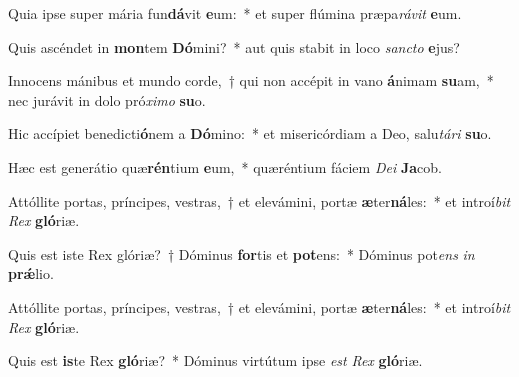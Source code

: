 \item Quia ipse super mária fun\textbf{dá}vit \textbf{e}um:~* et super flúmina præpa\textit{rá}\textit{vit} \textbf{e}um.
\item Quis ascéndet in \textbf{mon}tem \textbf{Dó}mini?~* aut quis stabit in loco \textit{sanc}\textit{to} \textbf{e}jus?
\item Innocens mánibus et mundo corde,~† qui non accépit in vano \textbf{á}nimam \textbf{su}am,~* nec jurávit in dolo pró\textit{xi}\textit{mo} \textbf{su}o.
\item Hic accípiet benedicti\textbf{ó}nem a \textbf{Dó}mino:~* et misericórdiam a Deo, salu\textit{tá}\textit{ri} \textbf{su}o.
\item Hæc est generátio quæ\textbf{rén}tium \textbf{e}um,~* quæréntium fáciem \textit{De}\textit{i} \textbf{Ja}cob.
\item Attóllite portas, príncipes, vestras,~† et elevámini, portæ \textbf{æ}ter\textbf{ná}les:~* et introí\textit{bit} \textit{Rex} \textbf{gló}riæ.
\item Quis est iste Rex glóriæ?~† Dóminus \textbf{for}tis et \textbf{pot}ens:~* Dóminus pot\textit{ens} \textit{in} \textbf{prǽ}lio.
\item Attóllite portas, príncipes, vestras,~† et elevámini, portæ \textbf{æ}ter\textbf{ná}les:~* et introí\textit{bit} \textit{Rex} \textbf{gló}riæ.
\item Quis est \textbf{is}te Rex \textbf{gló}riæ?~* Dóminus virtútum ipse \textit{est} \textit{Rex} \textbf{gló}riæ.
